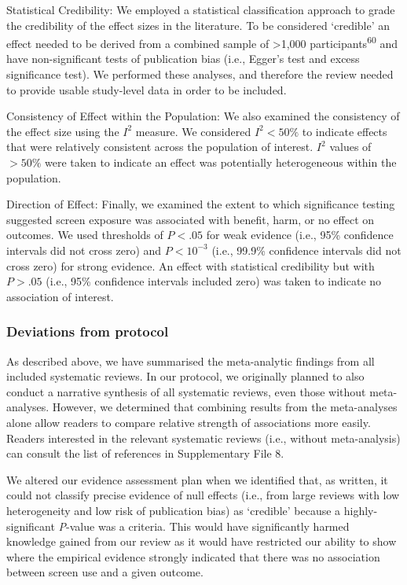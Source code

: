 \documentclass[
  english,
  man]{apa6}
\begin{document}
Statistical Credibility:
We employed a statistical classification approach to grade the credibility of the effect sizes in the literature.
To be considered `credible' an effect needed to be derived from a combined sample of \textgreater1,000 participants\textsuperscript{60} and have non-significant tests of publication bias (i.e., Egger's test and excess significance test).
We performed these analyses, and therefore the review needed to provide usable study-level data in order to be included.

Consistency of Effect within the Population:
We also examined the consistency of the effect size using the \(I^2\) measure.
We considered \(I^2 < 50\%\) to indicate effects that were relatively consistent across the population of interest.
\(I^2\) values of \(> 50\%\) were taken to indicate an effect was potentially heterogeneous within the population.

Direction of Effect:
Finally, we examined the extent to which significance testing suggested screen exposure was associated with benefit, harm, or no effect on outcomes.
We used thresholds of \(P < .05\) for weak evidence (i.e., 95\% confidence intervals did not cross zero) and \(P < 10^{-3}\) (i.e., 99.9\% confidence intervals did not cross zero) for strong evidence.
An effect with statistical credibility but with \(P > .05\) (i.e., 95\% confidence intervals included zero) was taken to indicate no association of interest.

\hypertarget{deviations-from-protocol}{%
\subsubsection{Deviations from protocol}\label{deviations-from-protocol}}

As described above, we have summarised the meta-analytic findings from all included systematic reviews.
In our protocol, we originally planned to also conduct a narrative synthesis of all systematic reviews, even those without meta-analyses.
However, we determined that combining results from the meta-analyses alone allow readers to compare relative strength of associations more easily.
Readers interested in the relevant systematic reviews (i.e., without meta-analysis) can consult the list of references in Supplementary File 8.

We altered our evidence assessment plan when we identified that, as written, it could not classify precise evidence of null effects (i.e., from large reviews with low heterogeneity and low risk of publication bias) as `credible' because a highly-significant \emph{P}-value was a criteria.
This would have significantly harmed knowledge gained from our review as it would have restricted our ability to show where the empirical evidence strongly indicated that there was no association between screen use and a given outcome.
\end{document}
